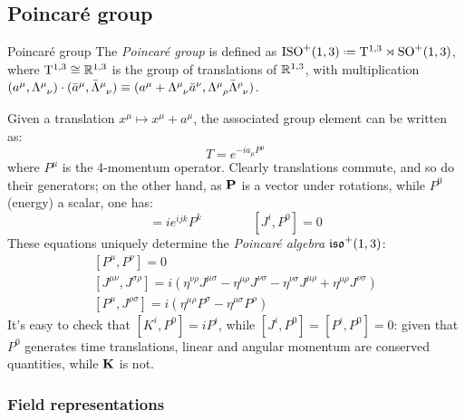 \subsection{Poincaré group}

\begin{definition}{Poincaré group}{}
  The \textit{Poincaré group} is defined as $ \pog \defeq \mathrm{T}^{1,3} \rtimes \lorg $, where $ \mathrm{T}^{1,3} \cong \mathbb{R}^{1,3} $ is the group of translations of $ \mathbb{R}^{1,3} $, with multiplication $ (a^\mu, \tensor{\Lambda}{^\mu_\nu}) \cdot (\bar{a}^\mu, \tensor{\bar{\Lambda}}{^\mu_\nu}) \equiv (a^\mu + \tensor{\Lambda}{^\mu_\nu} \bar{a}^\nu, \tensor{\Lambda}{^\mu_\rho} \tensor{\bar{\Lambda}}{^\rho_\nu}) $.
\end{definition}

Given a translation $ x^\mu \mapsto x^\mu + a^\mu $, the associated group element can be written as:
\begin{equation}
  T = e^{-i a_\mu P^\mu}
\end{equation}
where $ P^\mu $ is the 4-momentum operator. Clearly translations commute, and so do their generators; on the other hand, as $ \mathbf{P} $ is a vector under rotations, while $ P^0 $ (energy) a scalar, one has:
\begin{equation*}
  [J^i,P^j] = i e^{ijk} P^k
  \qquad \qquad
  [J^i,P^0] = 0
\end{equation*}
These equations uniquely determine the \textit{Poincaré algebra} $ \mathfrak{iso}^+(1,3) $:
\begin{equation}
  \begin{gathered}
    [P^\mu,P^\nu] = 0 \\
    [J^{\mu \nu}, J^{\sigma \rho}] = i \left( \eta^{\nu \rho} J^{\mu \sigma} - \eta^{\mu \rho} J^{\nu \sigma} - \eta^{\nu \sigma} J^{\mu \rho} + \eta^{\mu \rho} J^{\nu \sigma} \right) \\
    [P^\mu,J^{\rho \sigma}] = i \left( \eta^{\mu \rho} P^\sigma - \eta^{\mu \sigma} P^\rho \right)
  \end{gathered}
\end{equation}
It's easy to check that $ [K^i,P^0] = i P^i $, while $ [J^i,P^0] = [P^i,P^0] = 0 $: given that $ P^0 $ generates time translations, linear and angular momentum are conserved quantities, while $ \mathbf{K} $ is not.

\subsubsection{Field representations}

